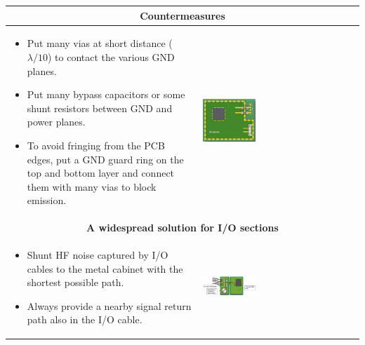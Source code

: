 		
		\begin{table}[h!]
		\centering
		\begin{tabular}{|m{}|m{}|}

				\multicolumn{2}{c}{\textbf{Countermeasures}}
			\\
			\hline
				\begin{itemize}
					\item Put many vias at short distance ($\lambda/10$) to contact the various GND planes. 
					\item Put many bypass capacitors or some shunt resistors between GND and power planes. 
					\item To avoid fringing from the PCB edges, put a GND guard ring on the top and bottom layer and connect them with many vias to block emission. 
				\end{itemize}
			& 
				 \begin{center}\includegraphics[width=0.35\textwidth]{images/GNDGuard.png}\end{center}  		
			\\
			\hline
			\multicolumn{2}{c}{\textbf{A widespread solution for I/O sections}}
			\\
			\hline
				\begin{itemize}
					\item Shunt HF noise captured by I/O cables to the metal cabinet with the shortest possible path.  
					\item Always provide a nearby signal return path also in the I/O cable. 
				\end{itemize}
			& 
				 \begin{center}\includegraphics[width=0.35\textwidth]{images/IOSections.png}\end{center}  		
			\\
			\hline
			\end{tabular}
		\end{table}	
		
